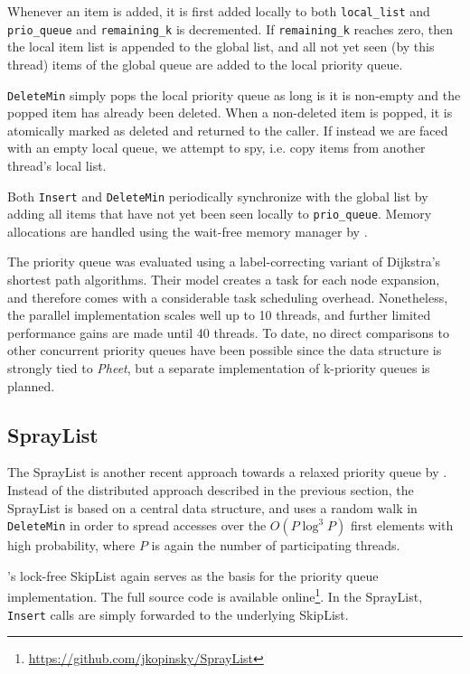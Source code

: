Whenever an item is added, it is first added locally to both \lstinline|local_list| and \lstinline|prio_queue|
and \lstinline|remaining_k| is decremented. If \lstinline|remaining_k| reaches zero, then the local
item list is appended to the global list, and all not yet seen (by this thread) items of the global
queue are added to the local priority queue.

\lstinline|DeleteMin| simply pops the local priority queue as long is it is non-empty and the popped
item has already been deleted. When a non-deleted item is popped, it is atomically marked as deleted
and returned to the caller. If instead we are faced with an empty local queue, we attempt to spy,
i.e. copy items from another thread's local list.

Both \lstinline|Insert| and \lstinline|DeleteMin| periodically synchronize with the global list
by adding all items that have not yet been seen locally to \lstinline|prio_queue|.
Memory allocations are handled using the wait-free memory manager by \citeauthor{wimmer2013wait} \cite{wimmer2013wait}.

The \citeauthor{wimmer2013data} priority queue was evaluated using a label-correcting variant
of Dijkstra's shortest path algorithms. Their model creates a task for each node
expansion, and therefore comes with a considerable task scheduling overhead. Nonetheless,
the parallel implementation scales well up to 10 threads, and further limited performance
gains are made until 40 threads. To date, no direct comparisons to other concurrent
priority queues have been possible since the data structure is strongly tied to \emph{Pheet},
but a separate implementation of k-priority queues is planned.

\subsection{SprayList} \label{sec:spraylist}

The SprayList is another recent approach towards a relaxed priority queue by \citeauthor{alistarhspraylist}
\cite{alistarhspraylist}. Instead of the distributed approach described in the previous section,
the SprayList is based on a central data structure, and uses a random walk in \lstinline|DeleteMin|
in order to spread accesses over the $O(P \log^3 P)$ first elements with high probability, where $P$
is again the number of participating threads.

\citeauthor{fraser2004practical}'s lock-free SkipList \cite{fraser2004practical} again serves as the
basis for the priority queue implementation. The full source code is available online\footnote{
\url{https://github.com/jkopinsky/SprayList}}. In the SprayList, \lstinline|Insert| calls are simply
forwarded to the underlying SkipList.

